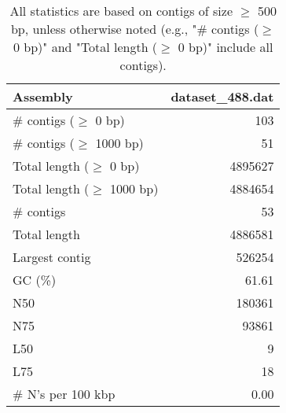 \documentclass[12pt,a4paper]{article}
\begin{document}
\begin{table}[ht]
\begin{center}
\caption{All statistics are based on contigs of size $\geq$ 500 bp, unless otherwise noted (e.g., "\# contigs ($\geq$ 0 bp)" and "Total length ($\geq$ 0 bp)" include all contigs).}
\begin{tabular}{|l*{1}{|r}|}
\hline
Assembly & dataset\_488.dat \\ \hline
\# contigs ($\geq$ 0 bp) & 103 \\ \hline
\# contigs ($\geq$ 1000 bp) & 51 \\ \hline
Total length ($\geq$ 0 bp) & 4895627 \\ \hline
Total length ($\geq$ 1000 bp) & 4884654 \\ \hline
\# contigs & 53 \\ \hline
Total length & 4886581 \\ \hline
Largest contig & 526254 \\ \hline
GC (\%) & 61.61 \\ \hline
N50 & 180361 \\ \hline
N75 & 93861 \\ \hline
L50 & 9 \\ \hline
L75 & 18 \\ \hline
\# N's per 100 kbp & 0.00 \\ \hline
\end{tabular}
\end{center}
\end{table}
\end{document}
